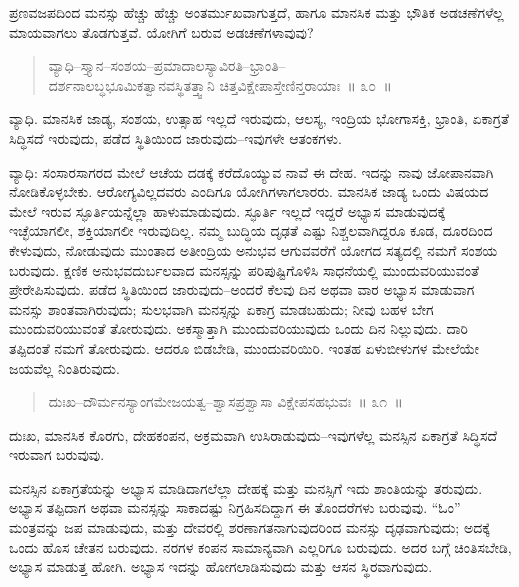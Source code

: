 ಪ್ರಣವಜಪದಿಂದ ಮನಸ್ಸು ಹೆಚ್ಚು ಹೆಚ್ಚು ಅಂತರ್ಮುಖವಾಗುತ್ತದೆ, ಹಾಗೂ ಮಾನಸಿಕ ಮತ್ತು ಭೌತಿಕ ಅಡಚಣೆಗಳೆಲ್ಲ ಮಾಯವಾಗಲು ತೊಡಗುತ್ತವೆ. ಯೋಗಿಗೆ ಬರುವ ಅಡಚಣೆಗಳಾವುವು?

\begin{verse}
ವ್ಯಾಧಿ–ಸ್ತ್ಯಾನ–ಸಂಶಯ–ಪ್ರಮಾದಾಲಸ್ಯಾವಿರತಿ–ಭ್ರಾಂತಿ–\\ದರ್ಶನಾಲಬ್ಧಭೂಮಿಕತ್ವಾನವಸ್ಥಿತತ್ತ್ವಾನಿ ಚಿತ್ತವಿಕ್ಷೇಪಾಸ್ತೇಣಿನ್ತರಾಯಾಃ~॥ ೩೦~॥
\end{verse}

\vspace{-0.3cm}

ವ್ಯಾಧಿ. ಮಾನಸಿಕ ಜಾಡ್ಯ, ಸಂಶಯ, ಉತ್ಸಾಹ ಇಲ್ಲದೆ ಇರುವುದು, ಆಲಸ್ಯ, ಇಂದ್ರಿಯ ಭೋಗಾಸಕ್ತಿ, ಭ್ರಾಂತಿ, ಏಕಾಗ್ರತೆ ಸಿದ್ಧಿಸದೆ ಇರುವುದು, ಪಡೆದ ಸ್ಥಿತಿಯಿಂದ ಜಾರುವುದು–ಇವುಗಳೇ ಆತಂಕಗಳು. 

ವ್ಯಾಧಿ: ಸಂಸಾರಸಾಗರದ ಮೇಲೆ ಆಚೆಯ ದಡಕ್ಕೆ ಕರೆದೊಯ್ಯುವ ನಾವೆ ಈ ದೇಹ. ಇದನ್ನು ನಾವು ಜೋಪಾನವಾಗಿ ನೋಡಿಕೊಳ್ಳಬೇಕು. ಆರೋಗ್ಯವಿಲ್ಲದವರು ಎಂದಿಗೂ ಯೋಗಿಗಳಾಗಲಾರರು. ಮಾನಸಿಕ ಜಾಡ್ಯ ಒಂದು ವಿಷಯದ ಮೇಲೆ ಇರುವ ಸ್ಫೂರ್ತಿಯನ್ನೆಲ್ಲಾ ಹಾಳುಮಾಡುವುದು. ಸ್ಫೂರ್ತಿ ಇಲ್ಲದೆ ಇದ್ದರೆ ಅಭ್ಯಾಸ ಮಾಡುವುದಕ್ಕೆ ಇಚ್ಛೆಯಾಗಲೀ, ಶಕ್ತಿಯಾಗಲೀ ಇರುವುದಿಲ್ಲ. ನಮ್ಮ ಬುದ್ಧಿಯ ದೃಢತೆ ಎಷ್ಟು ನಿಶ್ಚಲವಾಗಿದ್ದರೂ ಕೂಡ, ದೂರದಿಂದ ಕೇಳುವುದು, ನೋಡುವುದು ಮುಂತಾದ ಅತೀಂದ್ರಿಯ ಅನುಭವ ಆಗುವವರೆಗೆ ಯೋಗದ ಸತ್ಯದಲ್ಲಿ ನಮಗೆ ಸಂಶಯ ಬರುವುದು. ಕ್ಷಣಿಕ ಅನುಭವ\break ದುರ್ಬಲವಾದ ಮನಸ್ಸನ್ನು ಪರಿಪುಷ್ಟಿಗೊಳಿಸಿ ಸಾಧನೆಯಲ್ಲಿ ಮುಂದುವರಿಯುವಂತೆ ಪ್ರೇರೇಪಿಸುವುದು. ಪಡೆದ ಸ್ಥಿತಿಯಿಂದ ಜಾರುವುದು–ಅಂದರೆ ಕೆಲವು ದಿನ ಅಥವಾ ವಾರ ಅಭ್ಯಾಸ ಮಾಡುವಾಗ ಮನಸ್ಸು ಶಾಂತವಾಗಿರುವುದು; ಸುಲಭವಾಗಿ ಮನಸ್ಸನ್ನು ಏಕಾಗ್ರ ಮಾಡಬಹುದು; ನೀವು ಬಹಳ ಬೇಗ ಮುಂದುವರಿಯುವಂತೆ ತೋರುವುದು. ಅಕಸ್ಮಾತ್ತಾಗಿ ಮುಂದುವರಿಯುವುದು ಒಂದು ದಿನ ನಿಲ್ಲುವುದು. ದಾರಿ ತಪ್ಪಿದಂತೆ ನಮಗೆ ತೋರುವುದು. ಆದರೂ ಬಿಡಬೇಡಿ, ಮುಂದುವರಿಯಿರಿ. ಇಂತಹ ಏಳುಬೀಳುಗಳ ಮೇಲೆಯೇ ಜಯವೆಲ್ಲ ನಿಂತಿರುವುದು. 

\vspace{-0.3cm}

\begin{verse}
ದುಃಖ–ದೌರ್ಮನಸ್ಯಾಂಗಮೇಜಯತ್ವ–ಶ್ವಾಸಪ್ರಶ್ವಾಸಾ ವಿಕ್ಷೇಪಸಹಭುವಃ~॥ ೩೧~॥
\end{verse}

\vspace{-0.3cm}

ದುಃಖ, ಮಾನಸಿಕ ಕೊರಗು, ದೇಹಕಂಪನ, ಅಕ್ರಮವಾಗಿ ಉಸಿರಾಡುವುದು–ಇವುಗಳೆಲ್ಲ ಮನಸ್ಸಿನ ಏಕಾಗ್ರತೆ ಸಿದ್ಧಿಸದೆ ಇರುವಾಗ ಬರುವುವು. 

ಮನಸ್ಸಿನ ಏಕಾಗ್ರತೆಯನ್ನು ಅಭ್ಯಾಸ ಮಾಡಿದಾಗಲೆಲ್ಲಾ ದೇಹಕ್ಕೆ ಮತ್ತು ಮನಸ್ಸಿಗೆ ಇದು ಶಾಂತಿಯನ್ನು ತರುವುದು. ಅಭ್ಯಾಸ ತಪ್ಪಿದಾಗ ಅಥವಾ ಮನಸ್ಸನ್ನು ಸಾಕಾದಷ್ಟು ನಿಗ್ರಹಿಸದಿದ್ದಾಗ ಈ ತೊಂದರೆಗಳು ಬರುವುವು. “ಓಂ” ಮಂತ್ರವನ್ನು ಜಪ ಮಾಡುವುದು, ಮತ್ತು ದೇವರಲ್ಲಿ ಶರಣಾಗತನಾಗುವುದರಿಂದ ಮನಸ್ಸು ದೃಢವಾಗುವುದು; ಅದಕ್ಕೆ ಒಂದು ಹೊಸ ಚೇತನ ಬರುವುದು. ನರಗಳ ಕಂಪನ ಸಾಮಾನ್ಯವಾಗಿ ಎಲ್ಲರಿಗೂ ಬರುವುದು. ಅದರ ಬಗ್ಗೆ ಚಿಂತಿಸಬೇಡಿ, ಅಭ್ಯಾಸ ಮಾಡುತ್ತ ಹೋಗಿ. ಅಭ್ಯಾಸ ಇದನ್ನು ಹೋಗಲಾಡಿಸುವುದು ಮತ್ತು ಆಸನ ಸ್ಥಿರವಾಗುವುದು. 


